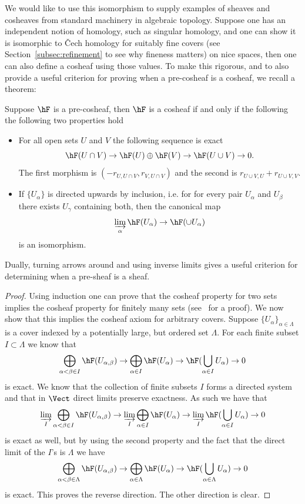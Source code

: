 We would like to use this isomorphism to supply examples of sheaves and cosheaves from standard machinery in algebraic topology. Suppose one has an independent notion of homology, such as singular homology, and one can show it is isomorphic to \v{C}ech homology for suitably fine covers (see Section~\ref{subsec:refinement} to see why fineness matters) on nice spaces, then one can also define a cosheaf using those values. To make this rigorous, and to also provide a useful criterion for proving when a pre-cosheaf is a cosheaf, we recall a theorem:

\begin{thm}\label{thm:MV_cosheaf}
	Suppose $\hF$ is a pre-cosheaf, then $\hF$ is a cosheaf if and only if the following the following two properties hold
	\begin{itemize}
		\item For all open sets $U$ and $V$ the following sequence is exact
		\[
			\hF(U\cap V) \to \hF(U)\oplus \hF(V) \to \hF(U\cup V) \to 0.
		\]
		The first morphism is $(-r_{U,U\cap V},r_{V,U\cap V})$ and the second is $r_{U\cup V,U}+r_{U\cup V,V}$.
		\item If  $\{U_{\alpha}\}$ is directed upwards by inclusion, i.e. for for every pair $U_{\alpha}$ and $U_{\beta}$ there exists $U_{\gamma}$ containing both, then the canonical map
		\[
			\varinjlim_{\alpha} \hF(U_{\alpha}) \to \hF(\cup U_{\alpha})
		\]
		is an isomorphism. 
	\end{itemize}
	Dually, turning arrows around and using inverse limits gives a useful criterion for determining when a pre-sheaf is a sheaf.
\end{thm}
\begin{proof}
	Using induction one can prove that the cosheaf property for two sets implies the cosheaf property for finitely many sets (see~\cite[p. 418]{Bredon} for a proof). We now show that this implies the cosheaf axiom for arbitrary covers. Suppose $\{U_{\alpha}\}_{\alpha\in\Lambda}$ is a cover indexed by a potentially large, but ordered set $\Lambda$. For each finite subset $I\subset \Lambda$ we know that
	\[
	\bigoplus_{\alpha<\beta\in I} \hF(U_{\alpha,\beta}) \to \bigoplus_{\alpha\in I} \hF(U_{\alpha}) \to \hF(\bigcup_{\alpha\in I} U_{\alpha}) \to 0
	\]
	is exact. We know that the collection of finite subsets $I$ forms a directed system and that in $\Vect$ direct limits preserve exactness. As such we have that
	\[
	\varinjlim_I \bigoplus_{\alpha<\beta\in I} \hF(U_{\alpha,\beta}) \to \varinjlim_I \bigoplus_{\alpha\in I} \hF(U_{\alpha}) \to \varinjlim_I \hF(\bigcup_{\alpha\in I} U_{\alpha}) \to 0
	\]
	is exact as well, but by using the second property and the fact that the direct limit of the $I$'s is $\Lambda$ we have
	\[
		\bigoplus_{\alpha<\beta\in \Lambda} \hF(U_{\alpha,\beta}) \to \bigoplus_{\alpha\in \Lambda} \hF(U_{\alpha}) \to \hF(\bigcup_{\alpha\in \Lambda} U_{\alpha}) \to 0
	\]
	is exact. This proves the reverse direction. The other direction is clear.
\end{proof}

